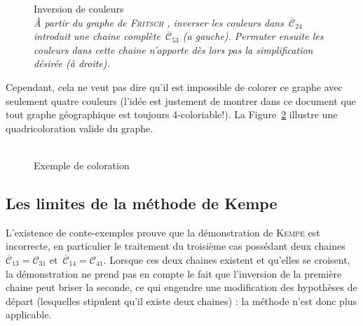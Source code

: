 \documentclass[french]{report}
\begin{document}
\begin{figure}[!h]\centering
	\begin{changemargin}{-3cm}{-3cm}
		\begin{center}
			
			\hspace{15pt}
			
		\end{center}
	\end{changemargin}
	\begin{changemargin}{1.75cm}{1.75cm}
		\caption{Inversion de couleurs\\ \footnotesize\textit{À partir du graphe de \textsc{Fritsch} , inverser les couleurs dans~$\overline{\mathcal{C}}_{24}$ introduit une chaine complète~$\overline{\mathcal{C}}_{53}$ (a gauche). Permuter ensuite les couleurs dans cette chaine n'apporte dès lors pas la simplification désirée (à droite).}}\label{fig:Fritsch_Inversion}
	\end{changemargin}	
\end{figure}
\FloatBarrier	


Cependant, cela ne veut pas dire qu'il est impossible de colorer ce graphe avec seulement quatre couleurs (l'idée est justement de montrer dans ce document que tout graphe géographique est toujours 4-coloriable!). La Figure~\ref{fig:Fritsch_ok} illustre une quadricoloration valide du graphe.

\begin{figure}
	
	\caption{\\Exemple de coloration%
	}\label{fig:Fritsch_ok}
\end{figure}
\FloatBarrier

\subsection{Les limites de la méthode de Kempe}

L'existence de conte-exemples prouve que la démonstration de \textsc{Kempe} est incorrecte, en particulier le traitement du troisième cas possédant deux chaines~$\overline{\mathcal{C}}_{13}=\mathcal{C}_{31}$ et~$\overline{\mathcal{C}}_{14}=\mathcal{C}_{41}$. Lorsque ces deux chaines existent et qu'elles se croisent, la démonstration ne prend pas en compte le fait que l'inversion de la première chaine peut briser la seconde, ce qui engendre une modification des hypothèses de départ (lesquelles stipulent qu'il existe deux chaines) : la méthode n'est donc plus applicable.\\
\end{document}
